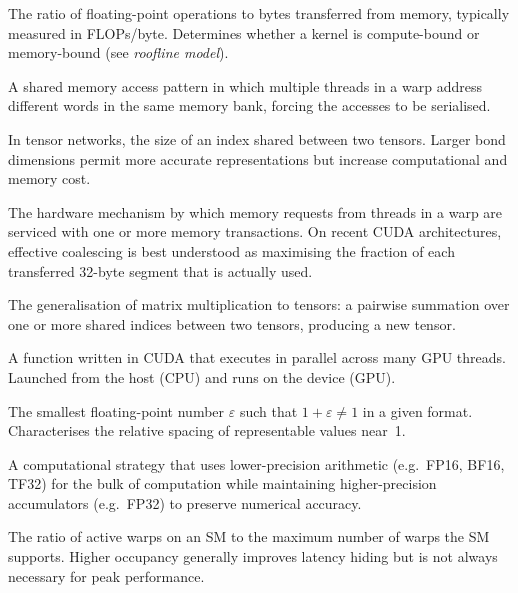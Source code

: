 \begin{description}[style=nextline, leftmargin=3.5cm, labelwidth=3.2cm]

  \item[Arithmetic intensity]
    The ratio of floating-point operations to bytes transferred from memory, typically measured in FLOPs/byte. Determines whether a kernel is compute-bound or memory-bound (see \emph{roofline model}).

  \item[Bank conflict]
    A shared memory access pattern in which multiple threads in a warp address different words in the same memory bank, forcing the accesses to be serialised.

  \item[Bond dimension]
    In tensor networks, the size of an index shared between two tensors. Larger bond dimensions permit more accurate representations but increase computational and memory cost.

  \item[Coalescing]
    The hardware mechanism by which memory requests from threads in a warp are
    serviced with one or more memory transactions. On recent CUDA
    architectures, effective coalescing is best understood as maximising the
    fraction of each transferred 32-byte segment that is actually used.

  \item[Contraction]
    The generalisation of matrix multiplication to tensors: a pairwise summation over one or more shared indices between two tensors, producing a new tensor.

  \item[Kernel]
    A function written in CUDA that executes in parallel across many GPU threads. Launched from the host (CPU) and runs on the device (GPU).

  \item[Machine epsilon]
    The smallest floating-point number $\varepsilon$ such that $1 + \varepsilon \neq 1$ in a given format. Characterises the relative spacing of representable values near~1.

  \item[Mixed precision]
    A computational strategy that uses lower-precision arithmetic (e.g.\ FP16, BF16, TF32) for the bulk of computation while maintaining higher-precision accumulators (e.g.\ FP32) to preserve numerical accuracy.

  \item[Occupancy]
    The ratio of active warps on an SM to the maximum number of warps the SM supports. Higher occupancy generally improves latency hiding but is not always necessary for peak performance.


\end{description}
